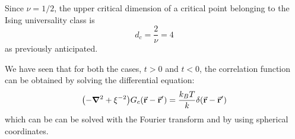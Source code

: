 \documentclass[../main/main.tex]{subfiles}
\begin{document}
\begin{remark}
Since \( \nu = 1/2 \), the upper critical dimension of a critical point belonging to the Ising universality class is
\begin{equation*}
  d_c = \frac{2}{\nu } = 4
\end{equation*}
as previously anticipated.
\end{remark}

We have seen that for both the cases, \( t>0 \) and \( t<0 \),  the correlation function  can be obtained by solving the differential equation:
\begin{equation}
  \qty(- \grad ^2 + \xi ^{-2}) G_c (\va{r}-\va{r}') = \frac{k_B T}{k} \delta (\va{r}-\va{r}')
  \label{eq:17_13}
\end{equation}
which can be can be solved  with the Fourier transform and by using spherical coordinates. 
\end{document}
